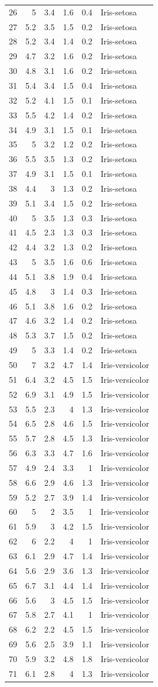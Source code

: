 \documentclass [oneside,10pt,a4paper,ngerman,BCOR10mm,headsepline,parindent,final]{scrartcl}
\begin{document}
\begin{longtable}[]{@{}rrrrrl@{}}
26 & 5 & 3.4 & 1.6 & 0.4 & Iris-setosa\tabularnewline
27 & 5.2 & 3.5 & 1.5 & 0.2 & Iris-setosa\tabularnewline
28 & 5.2 & 3.4 & 1.4 & 0.2 & Iris-setosa\tabularnewline
29 & 4.7 & 3.2 & 1.6 & 0.2 & Iris-setosa\tabularnewline
30 & 4.8 & 3.1 & 1.6 & 0.2 & Iris-setosa\tabularnewline
31 & 5.4 & 3.4 & 1.5 & 0.4 & Iris-setosa\tabularnewline
32 & 5.2 & 4.1 & 1.5 & 0.1 & Iris-setosa\tabularnewline
33 & 5.5 & 4.2 & 1.4 & 0.2 & Iris-setosa\tabularnewline
34 & 4.9 & 3.1 & 1.5 & 0.1 & Iris-setosa\tabularnewline
35 & 5 & 3.2 & 1.2 & 0.2 & Iris-setosa\tabularnewline
36 & 5.5 & 3.5 & 1.3 & 0.2 & Iris-setosa\tabularnewline
37 & 4.9 & 3.1 & 1.5 & 0.1 & Iris-setosa\tabularnewline
38 & 4.4 & 3 & 1.3 & 0.2 & Iris-setosa\tabularnewline
39 & 5.1 & 3.4 & 1.5 & 0.2 & Iris-setosa\tabularnewline
40 & 5 & 3.5 & 1.3 & 0.3 & Iris-setosa\tabularnewline
41 & 4.5 & 2.3 & 1.3 & 0.3 & Iris-setosa\tabularnewline
42 & 4.4 & 3.2 & 1.3 & 0.2 & Iris-setosa\tabularnewline
43 & 5 & 3.5 & 1.6 & 0.6 & Iris-setosa\tabularnewline
44 & 5.1 & 3.8 & 1.9 & 0.4 & Iris-setosa\tabularnewline
45 & 4.8 & 3 & 1.4 & 0.3 & Iris-setosa\tabularnewline
46 & 5.1 & 3.8 & 1.6 & 0.2 & Iris-setosa\tabularnewline
47 & 4.6 & 3.2 & 1.4 & 0.2 & Iris-setosa\tabularnewline
48 & 5.3 & 3.7 & 1.5 & 0.2 & Iris-setosa\tabularnewline
49 & 5 & 3.3 & 1.4 & 0.2 & Iris-setosa\tabularnewline
50 & 7 & 3.2 & 4.7 & 1.4 & Iris-versicolor\tabularnewline
51 & 6.4 & 3.2 & 4.5 & 1.5 & Iris-versicolor\tabularnewline
52 & 6.9 & 3.1 & 4.9 & 1.5 & Iris-versicolor\tabularnewline
53 & 5.5 & 2.3 & 4 & 1.3 & Iris-versicolor\tabularnewline
54 & 6.5 & 2.8 & 4.6 & 1.5 & Iris-versicolor\tabularnewline
55 & 5.7 & 2.8 & 4.5 & 1.3 & Iris-versicolor\tabularnewline
56 & 6.3 & 3.3 & 4.7 & 1.6 & Iris-versicolor\tabularnewline
57 & 4.9 & 2.4 & 3.3 & 1 & Iris-versicolor\tabularnewline
58 & 6.6 & 2.9 & 4.6 & 1.3 & Iris-versicolor\tabularnewline
59 & 5.2 & 2.7 & 3.9 & 1.4 & Iris-versicolor\tabularnewline
60 & 5 & 2 & 3.5 & 1 & Iris-versicolor\tabularnewline
61 & 5.9 & 3 & 4.2 & 1.5 & Iris-versicolor\tabularnewline
62 & 6 & 2.2 & 4 & 1 & Iris-versicolor\tabularnewline
63 & 6.1 & 2.9 & 4.7 & 1.4 & Iris-versicolor\tabularnewline
64 & 5.6 & 2.9 & 3.6 & 1.3 & Iris-versicolor\tabularnewline
65 & 6.7 & 3.1 & 4.4 & 1.4 & Iris-versicolor\tabularnewline
66 & 5.6 & 3 & 4.5 & 1.5 & Iris-versicolor\tabularnewline
67 & 5.8 & 2.7 & 4.1 & 1 & Iris-versicolor\tabularnewline
68 & 6.2 & 2.2 & 4.5 & 1.5 & Iris-versicolor\tabularnewline
69 & 5.6 & 2.5 & 3.9 & 1.1 & Iris-versicolor\tabularnewline
70 & 5.9 & 3.2 & 4.8 & 1.8 & Iris-versicolor\tabularnewline
71 & 6.1 & 2.8 & 4 & 1.3 & Iris-versicolor\tabularnewline

\end{longtable}
\end{document}

